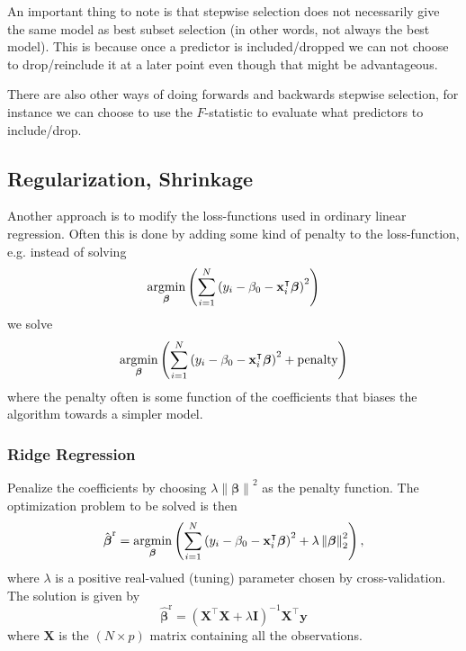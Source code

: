 \documentclass[a4paper, 12pt]{scrartcl}
\newcommand{\bfbeta}{\boldsymbol{\beta}}
\begin{document}
An important thing to note is that stepwise selection does not necessarily give the same model as best subset selection (in other words, not always the best model).
This is because once a predictor is included/dropped we can not choose to drop/reinclude it at a later point even though that might be advantageous.

There are also other ways of doing forwards and backwards stepwise selection, for instance we can choose to use the $F$-statistic to evaluate what predictors to include/drop.

\subsection{Regularization, Shrinkage}
Another approach is to modify the loss-functions used in ordinary linear regression.
Often this is done by adding some kind of penalty to the loss-function, e.g. instead of solving
\begin{equation*}
	\operatornamewithlimits{argmin}_{\bfbeta}\left( \sum_{i=1}^{N}\left(y_i-\beta_0-\mathbf{x}_i^\intercal\bfbeta \right)^2\right)
\end{equation*}
we solve
\begin{equation*}
	\operatornamewithlimits{argmin}_{\bfbeta}\left( \sum_{i=1}^{N}\left(y_i-\beta_0-\mathbf{x}_i^\intercal\bfbeta\right)^2+\text{penalty}\right)
\end{equation*}
where the penalty often is some function of the coefficients that biases the algorithm towards a simpler model.

\subsubsection*{Ridge Regression}
\begin{algorithm}
Penalize the coefficients by choosing $\lambda\left\|\bfbeta\right\|^2$ as the penalty function.
The optimization problem to be solved is then
\begin{equation*} \hat{\bfbeta}^\mathrm{r}=\operatornamewithlimits{argmin}_{\bfbeta}\left( \sum_{i=1}^{N}\left(y_i-\beta_0-\mathbf{x}_i^\intercal\bfbeta\right)^2+\lambda\left\|\bfbeta\right\|^2_2\right),
\end{equation*}
where $\lambda$ is a positive real-valued (tuning) parameter chosen by cross-validation.
The solution is given by
\begin{equation*}
	\hat{\bfbeta}^\mathrm{r}=\left(\mathbf{X}^\intercal\mathbf{X}+\lambda\mathbf{I}\right)^{-1}\mathbf{X}^\intercal\mathbf{y}
\end{equation*}
where $\mathbf{X}$ is the $\left(N\times p\right)$ matrix containing all the observations.
\end{algorithm}
\end{document}
